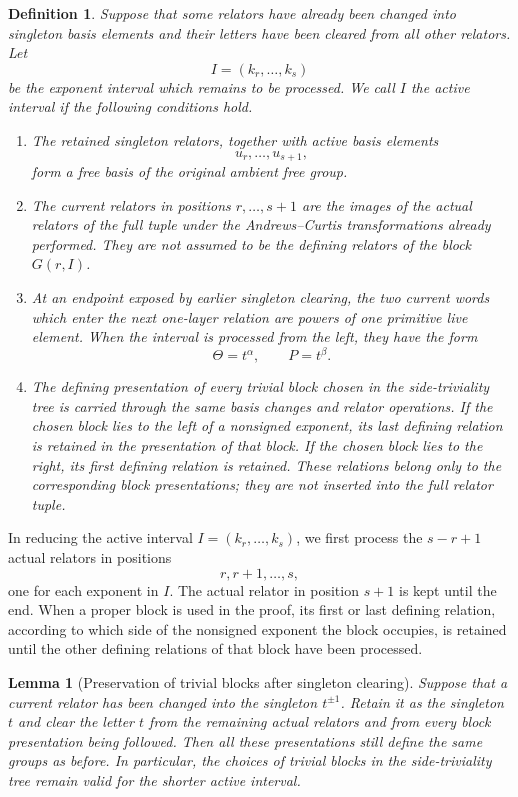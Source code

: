 \documentclass{article}
\newtheorem{lm}[theorem]{Lemma}
\newtheorem{df}[theorem]{Definition}
\begin{document}
\begin{df}
\label{def:relative-algebraic-active-interval}
Suppose that some relators have already been changed into singleton basis
elements and their letters have been cleared from all other relators.  Let
\[
 I=(k_r,\ldots,k_s)
\]
be the exponent interval which remains to be processed.  We call $I$ the
active interval if the following conditions hold.

\begin{enumerate}
\item The retained singleton relators, together with active basis elements
\[
 u_r,\ldots,u_{s+1},
\]
form a free basis of the original ambient free group.

\item The current relators in positions $r,\ldots,s+1$ are the images of the
actual relators of the full tuple under the Andrews--Curtis transformations
already performed.  They are not assumed to be the defining relators of the
block $G(r,I)$.

\item At an endpoint exposed by earlier singleton clearing, the two current
words which enter the next one-layer relation are powers of one primitive
live element.  When the interval is processed from the left, they have the
form
\[
 \Theta=t^{\alpha},\qquad P=t^{\beta}.
\]
\item
The defining presentation of every trivial block chosen in the
side-triviality tree is carried through the same basis changes and
relator operations.  If the chosen block lies to the left of a nonsigned
exponent, its last defining relation is retained in the presentation of
that block.  If the chosen block lies to the right, its first defining
relation is retained.  These relations belong only to the corresponding
block presentations; they are not inserted into the full relator tuple.

\end{enumerate}
\end{df}

In reducing the active interval $I=(k_r,\ldots,k_s)$, we first process the
$s-r+1$ actual relators in positions
\[
 r,r+1,\ldots,s,
\]
one for each exponent in $I$.  The actual relator in position $s+1$ is kept
until the end. When a proper block is used in the proof, its first or last defining
relation, according to which side of the nonsigned exponent the block
occupies, is retained until the other defining relations of that block
have been processed. 
\begin{lm}[Preservation of trivial blocks after singleton clearing]
\label{lem:trivial-blocks-singleton-clearing}
Suppose that a current relator has been changed into the singleton
$t^{\pm1}$.  Retain it as the singleton $t$ and clear the letter $t$ from the
remaining actual relators and from every block presentation being followed.
Then all these presentations still define the same groups as before.  In
particular, the choices of trivial blocks in the side-triviality tree remain
valid for the shorter active interval.
\end{lm}
\end{document}
